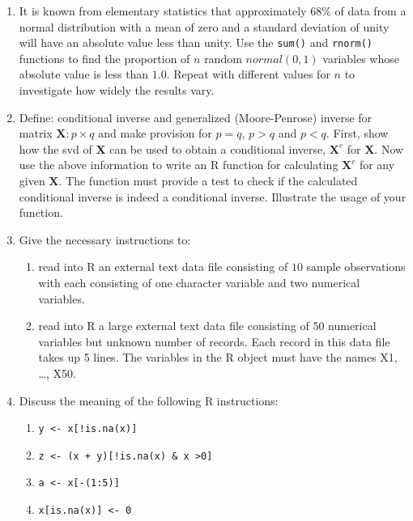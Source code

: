 \documentclass[
]{book}
\providecommand{\tightlist}{%
  \setlength{\itemsep}{0pt}\setlength{\parskip}{0pt}}
\begin{document}
\begin{enumerate}
\def\labelenumi{(\arabic{enumi})}
\item
  It is known from elementary statistics that approximately 68\% of data from a normal distribution with a mean of zero and a standard deviation of unity will have an absolute value less than unity. Use the \texttt{sum()} and \texttt{rnorm()} functions to find the proportion of \(n\) random \(normal (0, 1)\) variables whose absolute value is less than \(1.0\). Repeat with different values for \(n\) to investigate how widely the results vary.
\item
  Define: conditional inverse and generalized (Moore-Penrose) inverse for matrix \(\mathbf{X}: p \times q\) and make provision for \(p = q\), \(p > q\) and \(p < q\). First, show how the svd of \(\mathbf{X}\) can be used to obtain a conditional inverse, \(\mathbf{X}^c\) for \(\mathbf{X}\). Now use the above information to write an R function for calculating \(\mathbf{X}^c\) for any given \(\mathbf{X}\). The function must provide a test to check if the calculated conditional inverse is indeed a conditional inverse. Illustrate the usage of your function.
\item
  Give the necessary instructions to:

  \begin{enumerate}
  \def\labelenumii{(\roman{enumii})}
  \tightlist
  \item
    read into R an external text data file consisting of \(10\) sample observations with each consisting of one character variable and two numerical variables.
  \item
    read into R a large external text data file consisting of \(50\) numerical variables but unknown number of records. Each record in this data file takes up 5 lines. The variables in the R object must have the names X1, \ldots, X50.
  \end{enumerate}
\item
  Discuss the meaning of the following R instructions:

  \begin{enumerate}
  \def\labelenumii{(\roman{enumii})}
  \tightlist
  \item
    \texttt{y\ \textless{}-\ x{[}!is.na(x){]}}
  \item
    \texttt{z\ \textless{}-\ (x\ +\ y){[}!is.na(x)\ \&\ x\ \textgreater{}0{]}}
  \item
    \texttt{a\ \textless{}-\ x{[}-(1:5){]}}
  \item
    \texttt{x{[}is.na(x){]}\ \textless{}-\ 0}
  \end{enumerate}
\end{enumerate}
\end{document}
